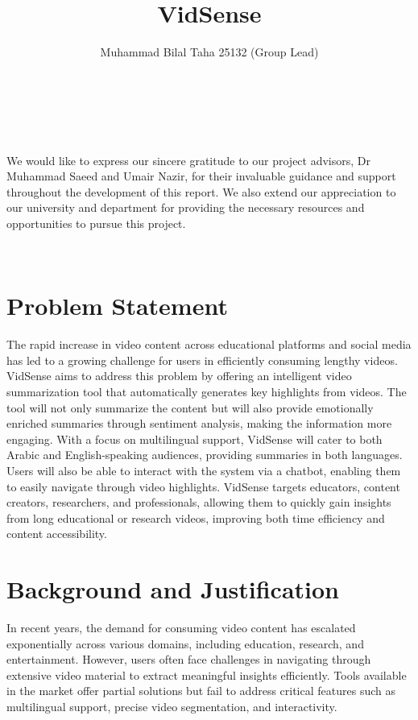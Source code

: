 \documentclass{bscs}
\title{VidSense}
\author{Muhammad Bilal Taha 25132 (Group Lead)\\
         [Muhammad Muaz Arif]\\
         [Muhammad Wasay]\\
         [Syed Bilal Ali]\\
         [Ali Iqbal]}
\begin{document}
\frontmatter
\maketitle

\begin{acknowledgement}
We would like to express our sincere gratitude to our project advisors, Dr Muhammad Saeed and 
Umair Nazir, for their invaluable guidance and support throughout the development of this 
report. We also extend our appreciation to our university and department for providing the 
necessary resources and opportunities to pursue this project. 
\end{acknowledgement}

\tableofcontents
\


\mainmatter
\chapter{Problem Statement}
The rapid increase in video content across educational platforms and social media has led to a growing challenge for users in efficiently consuming lengthy videos. VidSense aims to address this problem by offering an intelligent video summarization tool that automatically generates key highlights from videos. The tool will not only summarize the content but will also provide emotionally enriched summaries through sentiment analysis, making the information more engaging.
With a focus on multilingual support, VidSense will cater to both Arabic and English-speaking audiences, providing summaries in both languages. Users will also be able to interact with the system via a chatbot, enabling them to easily navigate through video highlights.
VidSense targets educators, content creators, researchers, and professionals, allowing them to quickly gain insights from long educational or research videos, improving both time efficiency and content accessibility.



\chapter{Background and Justification}
In recent years, the demand for consuming video content has escalated exponentially across various domains, including education, research, and entertainment. However, users often face challenges in navigating through extensive video material to extract meaningful insights efficiently. Tools available in the market offer partial solutions but fail to address critical features such as multilingual support, precise video segmentation, and interactivity.
\end{document}
